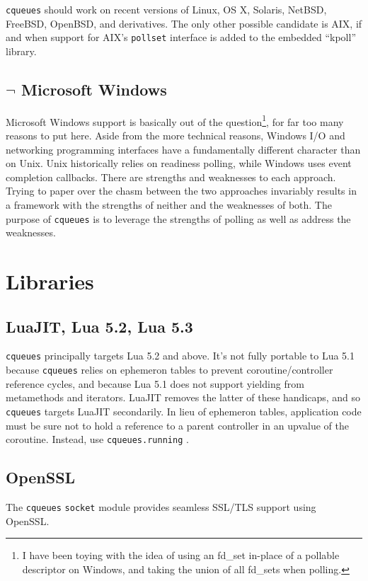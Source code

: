 \documentclass[11pt, oneside]{memoir}
\newcommand{\cqueues}[0]{\texttt{cqueues} }
\newcommand{\syscall}[1]{\texttt{#1} }
\newcommand{\fn}[1]{\texttt{#1} }
\newcommand{\module}[1]{\texttt{#1} }
\begin{document}
\cqueues should work on recent versions of Linux, OS X, Solaris, NetBSD, FreeBSD, OpenBSD, and derivatives. The only other possible candidate is AIX, if and when support for AIX's \syscall{pollset} interface is added to the embedded ``kpoll'' library.

\subsection{$\lnot$ Microsoft Windows}

Microsoft Windows support is basically out of the question\footnote{I have been toying with the idea of using an fd\_set in-place of a pollable descriptor on Windows, and taking the union of all fd\_sets when polling.}, for far too many reasons to put here. Aside from the more technical reasons, Windows I/O and networking programming interfaces have a fundamentally different character than on Unix. Unix historically relies on readiness polling, while Windows uses event completion callbacks. There are strengths and weaknesses to each approach. Trying to paper over the chasm between the two approaches invariably results in a framework with the strengths of neither and the weaknesses of both. The purpose of \cqueues is to leverage the strengths of polling as well as address the weaknesses.

\section{Libraries}

\subsection{LuaJIT, Lua 5.2, Lua 5.3}
\cqueues principally targets Lua 5.2 and above. It's not fully portable to Lua 5.1 because \cqueues relies on ephemeron tables to prevent coroutine/controller reference cycles, and because Lua 5.1 does not support yielding from metamethods and iterators. LuaJIT removes the latter of these handicaps, and so \cqueues targets LuaJIT secondarily. In lieu of ephemeron tables, application code must be sure not to hold a reference to a parent controller in an upvalue of the coroutine. Instead, use \fn{cqueues.running}.

\subsection{OpenSSL}
The \cqueues \module{socket} module provides seamless SSL/TLS support using OpenSSL.
\end{document}
